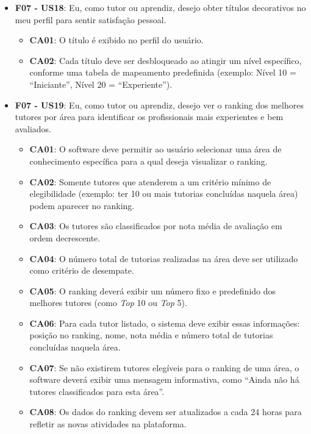 \begin{itemize}
\begin{itemize}
\end{itemize}

\item \textbf{F07 - US18}: Eu, como tutor ou aprendiz, desejo obter títulos decorativos no meu perfil para sentir satisfação pessoal.

\begin{itemize}

\item \textbf{CA01}: O título é exibido no perfil do usuário. 

\item \textbf{CA02}: Cada título deve ser desbloqueado ao atingir um nível específico, conforme uma tabela de mapeamento predefinida (exemplo: Nível 10 = ``Iniciante'', Nível 20 = ``Experiente'').

\end{itemize}

\item \textbf{F07 - US19}: Eu, como tutor ou aprendiz, desejo ver o ranking dos melhores tutores por área para identificar os profissionais mais experientes e bem avaliados.

\begin{itemize}

\item \textbf{CA01}: O software deve permitir ao usuário selecionar uma área de conhecimento específica para a qual deseja visualizar o ranking.

\item \textbf{CA02}: Somente tutores que atenderem a um critério mínimo de elegibilidade (exemplo: ter 10 ou mais tutorias concluídas naquela área) podem aparecer no ranking.

\item \textbf{CA03}: Os tutores são classificados por nota média de avaliação em ordem decrescente.

\item \textbf{CA04}: O número total de tutorias realizadas na área deve ser utilizado como critério de desempate.

\item \textbf{CA05}: O ranking deverá exibir um número fixo e predefinido dos melhores tutores (como \textit{Top} 10 ou \textit{Top} 5).

\item \textbf{CA06}: Para cada tutor listado, o sistema deve exibir essas informações: posição no ranking, nome, nota média e número total de tutorias concluídas naquela área.

\item \textbf{CA07}: Se não existirem tutores elegíveis para o ranking de uma área, o software deverá exibir uma mensagem informativa, como ``Ainda não há tutores classificados para esta área''.

\item \textbf{CA08}: Os dados do ranking devem ser atualizados a cada 24 horas para refletir as novas atividades na plataforma.

\end{itemize}

\end{itemize}

